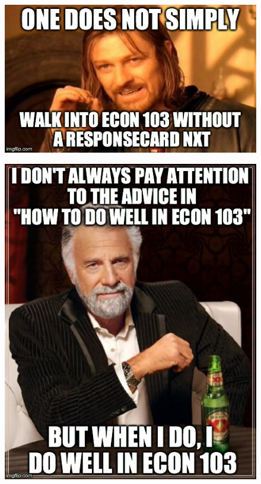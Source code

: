 \documentclass[handout]{beamer}
\begin{document}
\begin{frame}

\begin{figure}
\includegraphics[scale=0.5]{./images/ResponseCardMeme.jpg}
\end{figure}


\end{frame}
\begin{frame}

\begin{figure}
\includegraphics[scale=0.4]{./images/DoWellMeme.jpg}
\end{figure}


\end{frame}
\end{document}
